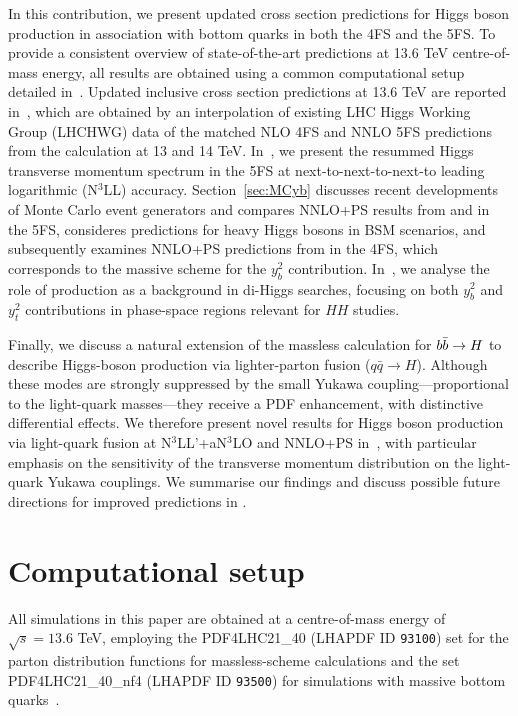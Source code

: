 \documentclass[11pt,a4paper]{article}
\begin{document}
In this contribution, we present updated cross section predictions for Higgs boson production in association with bottom quarks in both the 4FS and the 5FS. 
To provide a consistent overview of state-of-the-art \bbH{} predictions at 13.6 TeV centre-of-mass energy, all results are obtained using 
a common computational setup detailed in~. Updated inclusive cross section predictions at 13.6 TeV are 
reported in~, which are obtained by an interpolation of existing LHC Higgs Working Group (LHCHWG) data \cite{LHCHiggsCrossSectionWorkingGroup:2016ypw} of the 
matched NLO 4FS and NNLO 5FS predictions from the \nlonnllpart{} calculation at 13 and 14 TeV. 
In~, we present the resummed Higgs transverse momentum spectrum in the 5FS 
at next-to-next-to-next-to leading logarithmic (N$^3$LL) accuracy.
Section~\ref{sec:MCyb} discusses recent developments of Monte Carlo event generators and compares NNLO+PS results
from \minnlo{} and \GENEVA{} in the 5FS, consideres \minnlo{} predictions for heavy Higgs bosons in BSM scenarios, 
and subsequently examines NNLO+PS predictions from \minnlo{} in the 4FS, which corresponds to the massive scheme for the $y_b^2$ contribution.
In~, we analyse the role of \bbH{} production as a background in di-Higgs searches, 
focusing on both $y_b^2$ and $y_t^2$ contributions in phase-space regions relevant for $HH$ studies.

Finally, we discuss a natural extension of the massless calculation for $b\bar{b}\rightarrow H$ to describe Higgs-boson production via lighter-parton fusion ($q\bar q \rightarrow H$). Although these modes are strongly suppressed by the small Yukawa coupling—proportional to the light-quark masses—they receive a PDF enhancement, with distinctive differential effects. We therefore present novel results for Higgs boson production via light-quark fusion at N$^3$LL'+aN$^3$LO and NNLO+PS in~, 
with particular emphasis on the sensitivity of the transverse momentum distribution on the light-quark Yukawa couplings.
We summarise our findings and discuss possible future directions for improved \bbH{} predictions in .

\section{Computational setup}\label{sec:setup}
All simulations in this paper are obtained at a centre-of-mass energy of $\sqrt{s}=13.6$ TeV, employing the PDF4LHC21\_40 (LHAPDF ID \texttt{93100}) set for the parton distribution functions for massless-scheme calculations and the set PDF4LHC21\_40\_nf4 (LHAPDF ID \texttt{93500}) for simulations with massive bottom quarks~\cite{PDF4LHCWorkingGroup:2022cjn}. 
\end{document}
